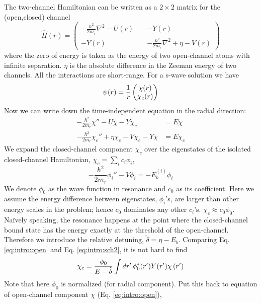The two-channel Hamiltonian can be written as a $2\times2$ matrix for  the (open,closed) channel
\begin{equation}\label{eq:intro:ham}
\hat{H}(r)=
\begin{pmatrix}
-\frac{\hbar^{2}}{2m_{r}}\nabla^{2}-U(r)&\;&-Y(r)\\
-Y(r)&\;&-\frac{\hbar^{2}}{2m_{r}}\nabla^{2}+\eta-V(r)
\end{pmatrix}
\end{equation}
where the  zero of energy is taken as the energy of two open-channel atoms with infinite separation. $\eta$ is the absolute difference in the Zeeman energy of two channels.  All the interactions are short-range.  For a s-wave solution we have 
\begin{equation}
\psi(r)=\frac{1}{r}\begin{pmatrix}\chi(r)\\\chi_{c}(r)\end{pmatrix}
\end{equation}
Now we can write down the time-independent \sch equation in the radial direction:
\begin{align}
-\frac{\hbar^{2}}{2m_{r}}\chi''-U\chi-Y\chi_c&=E\chi\label{eq:intro:open}\\
-\frac{\hbar^{2}}{2m_{r}}\chi_c''+\eta\chi_c-V\chi_c-Y\chi&=E\chi_c\label{eq:intro:close}
\end{align}
We expand the closed-channel component $\chi_{c}$ over the eigenstates of the isolated closed-channel Hamiltonian, $\chi_{c}=\sum_{i}c_{i}\phi_{i}$, 
\begin{equation}\label{eq:intro:sch2}
-\frac{\hbar^{2}}{2m_{r}}\phi_{i}''-V \phi_{i}=-E_{b}^{(i)}\phi_{i}
\end{equation}
We denote $\phi_{0}$ as the wave function  in resonance and $c_{0}$ as its coefficient.  Here we assume the energy difference between eigenstates, $\phi_{i}$'s, are larger than other energy scales in the problem; hence $c_{0}$ dominates any other $c_{i}$'s.  $\chi_{c}\approx{}c_{0}\phi_{0}$.  Na\"{i}vely speaking, the resonance happens at the point where the closed-channel bound state has the energy exactly at the threshold of the open-channel.  Therefore we introduce the relative detuning, $\tilde\delta=\eta-E_{b}$. Comparing Eq. \ref{eq:intro:open} and Eq. \ref{eq:intro:sch2}, it is not hard to find
\begin{equation}\label{eq:intro:closeCoeff}
\chi_{c}=\frac{\phi_{0}}{E-\tilde\delta}\int{dr'}\,\phi_{0}^{*}(r')Y(r')\chi\left(r'\right)
\end{equation}
Note that here $\phi_{0}$ is normalized (for radial component).  Put this back to \sch equation of open-channel component $\chi$ (Eq. \ref{eq:intro:open}), 

